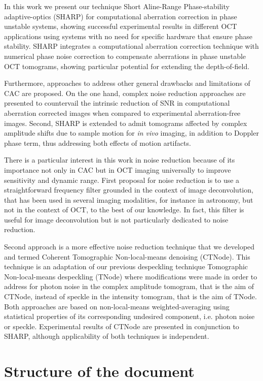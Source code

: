 In this work we present our technique Short Aline-Range Phase-stability adaptive-optics (SHARP) for computational aberration correction in phase unstable systems, showing successful experimental results in different OCT applications using systems with no need for specific hardware that ensure phase stability. SHARP integrates a computational aberration correction technique with numerical phase noise correction to compensate aberrations in phase unstable OCT tomograms, showing particular potential for extending the depth-of-field.

Furthermore, approaches to address other general drawbacks and limitations of CAC are proposed. On the one hand, complex noise reduction approaches are presented to countervail the intrinsic reduction of SNR in computational aberration corrected images when compared to experimental aberration-free images. Second, SHARP is extended to admit tomograms affected by complex amplitude shifts due to sample motion for \textit{in vivo} imaging, in addition to Doppler phase term, thus addressing both effects of motion artifacts.

There is a particular interest in this work in noise reduction because of its importance not only in CAC but in OCT imaging universally to improve sensitivity and dynamic range. First proposal for noise reduction is to use a straightforward frequency filter grounded in the context of image deconvolution, that has been used in several imaging modalities, for instance in astronomy, but not in the context of OCT, to the best of our knowledge. In fact, this filter is useful for image deconvolution but is not particularly dedicated to noise reduction.

Second approach is a more effective noise reduction technique that we developed and termed Coherent Tomographic Non-local-means denoising (CTNode). This technique is an adaptation of our previous despeckling technique Tomographic Non-local-means despeckling (TNode) where modifications were made in order to address for photon noise in the complex amplitude tomogram, that is the aim of CTNode, instead of speckle in the intensity tomogram, that is the aim of TNode. Both approaches are based on non-local-means weighted-averaging using statistical properties of its corresponding undesired component, i.e. photon noise or speckle. Experimental results of CTNode are presented in conjunction to SHARP, although applicability of both techniques is independent.

\section{Structure of the document}

